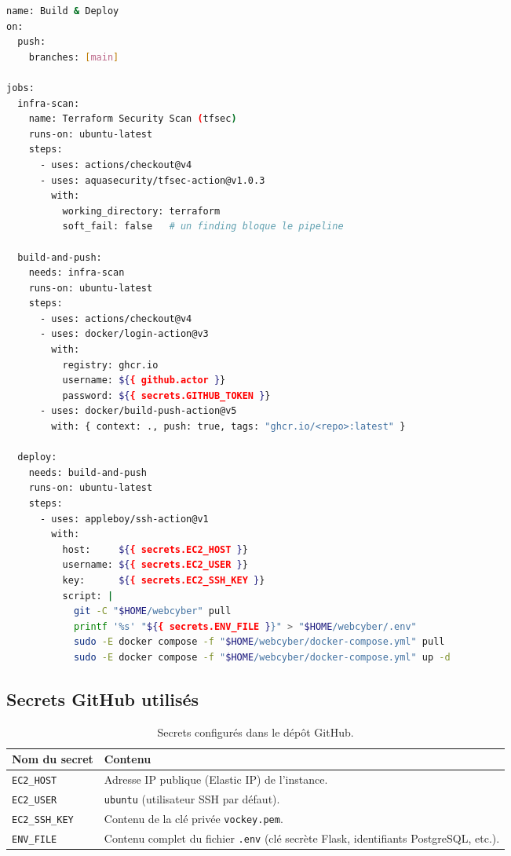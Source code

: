 \begin{lstlisting}[language=bash, caption={\texttt{.github/workflows/deploy.yml} (extrait).}]
name: Build & Deploy
on:
  push:
    branches: [main]

jobs:
  infra-scan:
    name: Terraform Security Scan (tfsec)
    runs-on: ubuntu-latest
    steps:
      - uses: actions/checkout@v4
      - uses: aquasecurity/tfsec-action@v1.0.3
        with:
          working_directory: terraform
          soft_fail: false   # un finding bloque le pipeline

  build-and-push:
    needs: infra-scan
    runs-on: ubuntu-latest
    steps:
      - uses: actions/checkout@v4
      - uses: docker/login-action@v3
        with:
          registry: ghcr.io
          username: ${{ github.actor }}
          password: ${{ secrets.GITHUB_TOKEN }}
      - uses: docker/build-push-action@v5
        with: { context: ., push: true, tags: "ghcr.io/<repo>:latest" }

  deploy:
    needs: build-and-push
    runs-on: ubuntu-latest
    steps:
      - uses: appleboy/ssh-action@v1
        with:
          host:     ${{ secrets.EC2_HOST }}
          username: ${{ secrets.EC2_USER }}
          key:      ${{ secrets.EC2_SSH_KEY }}
          script: |
            git -C "$HOME/webcyber" pull
            printf '%s' "${{ secrets.ENV_FILE }}" > "$HOME/webcyber/.env"
            sudo -E docker compose -f "$HOME/webcyber/docker-compose.yml" pull
            sudo -E docker compose -f "$HOME/webcyber/docker-compose.yml" up -d
\end{lstlisting}

\subsection{Secrets GitHub utilisés}

\begin{table}[H]
\centering
\caption{Secrets configurés dans le dépôt GitHub.}
\begin{tabular}{P{4cm} P{10cm}}
\toprule
\textbf{Nom du secret} & \textbf{Contenu} \\
\midrule
\texttt{EC2\_HOST}    & Adresse IP publique (Elastic IP) de l'instance. \\
\texttt{EC2\_USER}    & \texttt{ubuntu} (utilisateur SSH par défaut). \\
\texttt{EC2\_SSH\_KEY} & Contenu de la clé privée \texttt{vockey.pem}. \\
\texttt{ENV\_FILE}    & Contenu complet du fichier \texttt{.env} (clé secrète Flask, identifiants PostgreSQL, etc.). \\
\bottomrule
\end{tabular}
\end{table}

